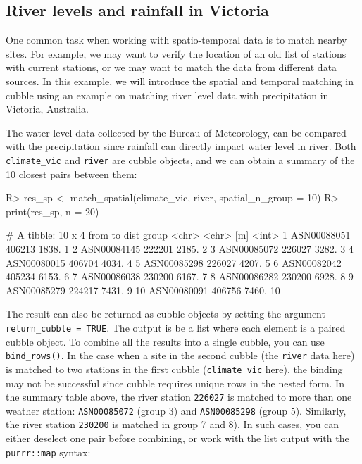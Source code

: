 \documentclass[
  shortnames]{jss}
\begin{document}
\hypertarget{river-levels-and-rainfall-in-victoria}{%
\subsection{River levels and rainfall in Victoria}\label{river-levels-and-rainfall-in-victoria}}

One common task when working with spatio-temporal data is to match nearby sites. For example, we may want to verify the location of an old list of stations with current stations, or we may want to match the data from different data sources. In this example, we will introduce the spatial and temporal matching in cubble using an example on matching river level data with precipitation in Victoria, Australia.

The water level data collected by the Bureau of Meteorology, can be compared with the precipitation since rainfall can directly impact water level in river. Both \texttt{climate\_vic} and \texttt{river} are cubble objects, and we can obtain a summary of the 10 closest pairs between them:

\begin{CodeChunk}
\begin{CodeInput}
R> res_sp <- match_spatial(climate_vic, river, spatial_n_group = 10)
R> print(res_sp, n = 20)
\end{CodeInput}
\begin{CodeOutput}
# A tibble: 10 x 4
   from        to      dist group
   <chr>       <chr>    [m] <int>
 1 ASN00088051 406213 1838.     1
 2 ASN00084145 222201 2185.     2
 3 ASN00085072 226027 3282.     3
 4 ASN00080015 406704 4034.     4
 5 ASN00085298 226027 4207.     5
 6 ASN00082042 405234 6153.     6
 7 ASN00086038 230200 6167.     7
 8 ASN00086282 230200 6928.     8
 9 ASN00085279 224217 7431.     9
10 ASN00080091 406756 7460.    10
\end{CodeOutput}
\end{CodeChunk}

The result can also be returned as cubble objects by setting the argument \texttt{return\_cubble\ =\ TRUE}. The output is be a list where each element is a paired cubble object. To combine all the results into a single cubble, you can use \texttt{bind\_rows()}. In the case when a site in the second cubble (the \texttt{river} data here) is matched to two stations in the first cubble (\texttt{climate\_vic} here), the binding may not be successful since cubble requires unique rows in the nested form. In the summary table above, the river station \texttt{226027} is matched to more than one weather station: \texttt{ASN00085072} (group 3) and \texttt{ASN00085298} (group 5). Similarly, the river station \texttt{230200} is matched in group 7 and 8). In such cases, you can either deselect one pair before combining, or work with the list output with the \texttt{purrr::map} syntax:
\end{document}
